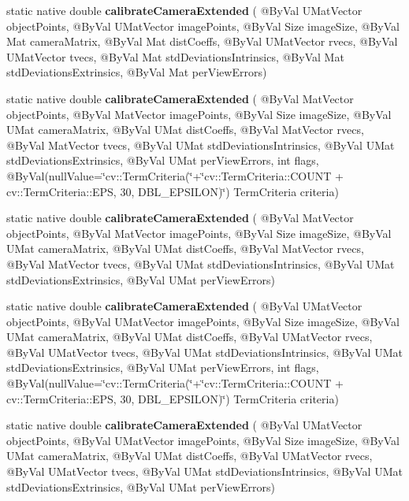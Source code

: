 \begin{DoxyCompactItemize}
static native double {\bfseries calibrate\+Camera\+Extended} ( @By\+Val U\+Mat\+Vector object\+Points, @By\+Val U\+Mat\+Vector image\+Points, @By\+Val Size image\+Size, @By\+Val Mat camera\+Matrix, @By\+Val Mat dist\+Coeffs, @By\+Val U\+Mat\+Vector rvecs, @By\+Val U\+Mat\+Vector tvecs, @By\+Val Mat std\+Deviations\+Intrinsics, @By\+Val Mat std\+Deviations\+Extrinsics, @By\+Val Mat per\+View\+Errors)
\item 
static native double {\bfseries calibrate\+Camera\+Extended} ( @By\+Val Mat\+Vector object\+Points, @By\+Val Mat\+Vector image\+Points, @By\+Val Size image\+Size, @By\+Val U\+Mat camera\+Matrix, @By\+Val U\+Mat dist\+Coeffs, @By\+Val Mat\+Vector rvecs, @By\+Val Mat\+Vector tvecs, @By\+Val U\+Mat std\+Deviations\+Intrinsics, @By\+Val U\+Mat std\+Deviations\+Extrinsics, @By\+Val U\+Mat per\+View\+Errors, int flags, @By\+Val(null\+Value=\char`\"{}cv\+::\+Term\+Criteria(\char`\"{}+\char`\"{}cv\+::\+Term\+Criteria\+::\+C\+O\+U\+NT + cv\+::\+Term\+Criteria\+::\+E\+PS, 30, D\+B\+L\+\_\+\+E\+P\+S\+I\+L\+ON)\char`\"{}) Term\+Criteria criteria)
\item 
static native double {\bfseries calibrate\+Camera\+Extended} ( @By\+Val Mat\+Vector object\+Points, @By\+Val Mat\+Vector image\+Points, @By\+Val Size image\+Size, @By\+Val U\+Mat camera\+Matrix, @By\+Val U\+Mat dist\+Coeffs, @By\+Val Mat\+Vector rvecs, @By\+Val Mat\+Vector tvecs, @By\+Val U\+Mat std\+Deviations\+Intrinsics, @By\+Val U\+Mat std\+Deviations\+Extrinsics, @By\+Val U\+Mat per\+View\+Errors)
\item 
static native double {\bfseries calibrate\+Camera\+Extended} ( @By\+Val U\+Mat\+Vector object\+Points, @By\+Val U\+Mat\+Vector image\+Points, @By\+Val Size image\+Size, @By\+Val U\+Mat camera\+Matrix, @By\+Val U\+Mat dist\+Coeffs, @By\+Val U\+Mat\+Vector rvecs, @By\+Val U\+Mat\+Vector tvecs, @By\+Val U\+Mat std\+Deviations\+Intrinsics, @By\+Val U\+Mat std\+Deviations\+Extrinsics, @By\+Val U\+Mat per\+View\+Errors, int flags, @By\+Val(null\+Value=\char`\"{}cv\+::\+Term\+Criteria(\char`\"{}+\char`\"{}cv\+::\+Term\+Criteria\+::\+C\+O\+U\+NT + cv\+::\+Term\+Criteria\+::\+E\+PS, 30, D\+B\+L\+\_\+\+E\+P\+S\+I\+L\+ON)\char`\"{}) Term\+Criteria criteria)
\item 
static native double {\bfseries calibrate\+Camera\+Extended} ( @By\+Val U\+Mat\+Vector object\+Points, @By\+Val U\+Mat\+Vector image\+Points, @By\+Val Size image\+Size, @By\+Val U\+Mat camera\+Matrix, @By\+Val U\+Mat dist\+Coeffs, @By\+Val U\+Mat\+Vector rvecs, @By\+Val U\+Mat\+Vector tvecs, @By\+Val U\+Mat std\+Deviations\+Intrinsics, @By\+Val U\+Mat std\+Deviations\+Extrinsics, @By\+Val U\+Mat per\+View\+Errors)

\end{DoxyCompactItemize}
